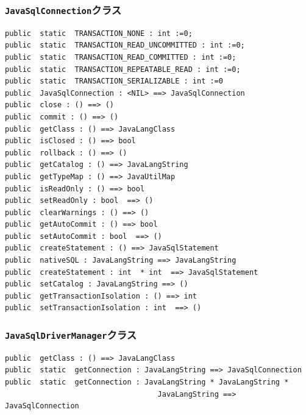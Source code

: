 \documentclass[\pformat,12pt]{jarticle}
\begin{document}
\subsubsection{\texttt{JavaSqlConnection}クラス}
\begin{small}
\begin{verbatim}
public  static  TRANSACTION_NONE : int :=0;
public  static  TRANSACTION_READ_UNCOMMITTED : int :=0;
public  static  TRANSACTION_READ_COMMITTED : int :=0;
public  static  TRANSACTION_REPEATABLE_READ : int :=0;
public  static  TRANSACTION_SERIALIZABLE : int :=0
public  JavaSqlConnection : <NIL> ==> JavaSqlConnection
public  close : () ==> ()
public  commit : () ==> ()
public  getClass : () ==> JavaLangClass
public  isClosed : () ==> bool
public  rollback : () ==> ()
public  getCatalog : () ==> JavaLangString
public  getTypeMap : () ==> JavaUtilMap
public  isReadOnly : () ==> bool
public  setReadOnly : bool  ==> ()
public  clearWarnings : () ==> ()
public  getAutoCommit : () ==> bool
public  setAutoCommit : bool  ==> ()
public  createStatement : () ==> JavaSqlStatement
public  nativeSQL : JavaLangString ==> JavaLangString
public  createStatement : int  * int  ==> JavaSqlStatement
public  setCatalog : JavaLangString ==> ()
public  getTransactionIsolation : () ==> int
public  setTransactionIsolation : int  ==> ()
\end{verbatim}
\end{small}

\subsubsection{\texttt{JavaSqlDriverManager}クラス}
\begin{small}
\begin{verbatim}
public  getClass : () ==> JavaLangClass
public  static  getConnection : JavaLangString ==> JavaSqlConnection
public  static  getConnection : JavaLangString * JavaLangString * 
                                   JavaLangString ==> JavaSqlConnection
\end{verbatim}
\end{small}
\end{document}
